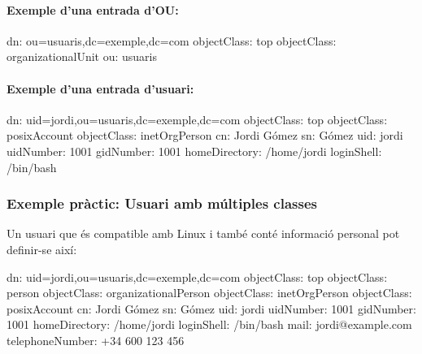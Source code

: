 \documentclass[
  12 pt,
  a4paper,
]{article}
\newenvironment{Shaded}{\begin{snugshade}}{\end{snugshade}}
\newcommand{\NormalTok}[1]{#1}
\begin{document}
\paragraph{Exemple d'una entrada d'OU:}\label{exemple-duna-entrada-dou}

\begin{Shaded}
\begin{Highlighting}[]
\NormalTok{dn: ou=usuaris,dc=exemple,dc=com}
\NormalTok{objectClass: top}
\NormalTok{objectClass: organizationalUnit}
\NormalTok{ou: usuaris}
\end{Highlighting}
\end{Shaded}

\paragraph{Exemple d'una entrada
d'usuari:}\label{exemple-duna-entrada-dusuari}

\begin{Shaded}
\begin{Highlighting}[]
\NormalTok{dn: uid=jordi,ou=usuaris,dc=exemple,dc=com}
\NormalTok{objectClass: top}
\NormalTok{objectClass: posixAccount}
\NormalTok{objectClass: inetOrgPerson}
\NormalTok{cn: Jordi Gómez}
\NormalTok{sn: Gómez}
\NormalTok{uid: jordi}
\NormalTok{uidNumber: 1001}
\NormalTok{gidNumber: 1001}
\NormalTok{homeDirectory: /home/jordi}
\NormalTok{loginShell: /bin/bash}
\end{Highlighting}
\end{Shaded}

\subsubsection{Exemple pràctic: Usuari amb múltiples
classes}\label{exemple-pruxe0ctic-usuari-amb-muxfaltiples-classes}

Un usuari que és compatible amb Linux i també conté informació personal
pot definir-se així:

\begin{Shaded}
\begin{Highlighting}[]
\NormalTok{dn: uid=jordi,ou=usuaris,dc=exemple,dc=com}
\NormalTok{objectClass: top}
\NormalTok{objectClass: person}
\NormalTok{objectClass: organizationalPerson}
\NormalTok{objectClass: inetOrgPerson}
\NormalTok{objectClass: posixAccount}
\NormalTok{cn: Jordi Gómez}
\NormalTok{sn: Gómez}
\NormalTok{uid: jordi}
\NormalTok{uidNumber: 1001}
\NormalTok{gidNumber: 1001}
\NormalTok{homeDirectory: /home/jordi}
\NormalTok{loginShell: /bin/bash}
\NormalTok{mail: jordi@example.com}
\NormalTok{telephoneNumber: +34 600 123 456}
\end{Highlighting}
\end{Shaded}
\end{document}
